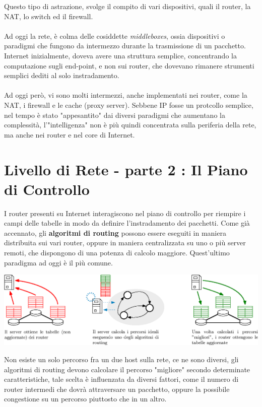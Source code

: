 \documentclass[12pt, letterpaper]{article}
\newcommand{\acc}{\\\hphantom{}\\}
\begin{document}
Questo tipo di astrazione, svolge il compito di vari dispositivi, quali il router, la NAT, lo switch ed il firewall.\acc 
Ad oggi la rete, è colma delle cosiddette \textit{middleboxes}, ossia dispositivi o paradigmi che fungono da intermezzo 
durante la trasmissione di un pacchetto. Internet inizialmente, doveva avere una struttura semplice, concentrando 
la computazione sugli end-point, e non sui router, che dovevano rimanere strumenti semplici dediti al solo instradamento. \acc 
Ad oggi però, vi sono molti intermezzi, anche implementati nei router, come la NAT, i firewall e le cache (proxy server). 
Sebbene IP fosse un protcollo semplice, nel tempo è stato "appesantito" dai diversi paradigmi che aumentano la complessità, 
l'"intelligenza" non è più quindi concentrata sulla periferia della rete, ma anche nei router e nel core di Internet.
\section{Livello di Rete - parte 2 : Il Piano di Controllo}
I router presenti su Internet interagiscono nel piano di controllo per riempire i campi delle tabelle in modo da definire 
l'instradamento dei pacchetti. Come già accennato, gli \textbf{algoritmi di routing} possono essere eseguiti in maniera distribuita 
sui vari router, oppure in maniera centralizzata su uno o più server remoti, che dispongono di una potenza di calcolo 
maggiore. Quest'ultimo paradigma ad oggi è il più comune. \begin{center}
    \includegraphics[width=\textwidth ]{images/routingAlgoritm.eps}
\end{center}
Non esiste un solo percorso fra un due host sulla rete, ce ne sono diversi, gli algoritmi di routing devono calcolare il 
percorso "migliore" secondo determinate caratteristiche, tale scelta è influenzata da diversi fattori, come il numero di 
router intermedi che dovrà attraversare un pacchetto, oppure la possibile congestione su un percorso piuttosto che in un 
altro. 
\end{document}
